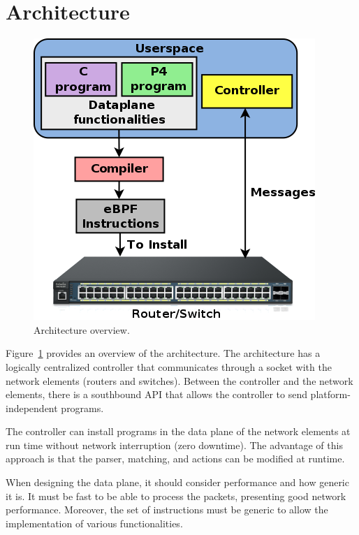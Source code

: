 \section{Architecture}
\label{sec:architecture}

 \begin{figure}[!htp]
 \centering
\includegraphics[width=.8\linewidth]{figures/03_fig01.png}
 \caption{Architecture overview.}
 \label{fig:03architecture}
 \end{figure}

Figure~\ref{fig:03architecture} provides an overview of the architecture.
The architecture has a logically centralized controller that communicates through a socket with the network elements (routers and switches). 
Between the controller and the network elements, there is a southbound API that allows the controller to send platform-independent programs.

The controller can install programs in the data plane of the network elements at run time without network interruption (zero downtime).
The advantage of this approach is that the parser, matching, and actions can be modified at runtime.


When designing the data plane, it should consider performance and how generic it is. It must be fast to be able to process the packets, presenting good network performance. Moreover,
the set of instructions must be generic to allow the implementation of various functionalities.

